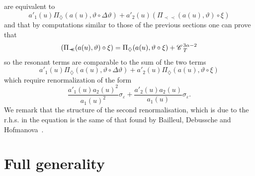 \documentclass[11pt,reqno]{amsart}
\newcommand{\precprec}{\prec\!\!\!\prec}
\newcommand{\CC}{\mathscr{C} \hspace{.1em}}
\begin{document}
are equivalent to
\[ a'_1 (u) \Pi_{\diamondsuit} (a (u), \vartheta \circ \Delta \vartheta) +
   a'_2 (u) (\Pi_{\precprec} (a (u), \vartheta) \circ \xi) \]
and that by computations similar to those of the previous sections one can
prove that
\[ (\Pi_{\precprec} (a (u), \vartheta) \circ \xi) = \Pi_{\diamondsuit} (a (u),
   \vartheta \circ \xi) + \CC^{3 \alpha - 2}_T \]
so the resonant terms are comparable to the sum of the two terms
\[ a'_1 (u) \Pi_{\diamondsuit} (a (u), \vartheta \circ \Delta \vartheta) +
   a'_2 (u) \Pi_{\diamondsuit} (a (u), \vartheta \circ \xi) \]
which require renormalization of the form
\begin{equation}
  \frac{a'_1 (u) a_2 (u)^2}{a_1 (u)^2} \sigma_{\varepsilon} + \frac{a'_2 (u)
  a_2 (u)}{a_1 (u)} \sigma_{\varepsilon} . \label{eq:renorm-non-linear-rhs}
\end{equation}
We remark that the structure of the second renormalisation, which is due to
the r.h.s. in the equation is the same of that found by Bailleul, Debussche
and Hofmanova~{\cite{hofmanova}}.

\section{Full generality}
\end{document}
